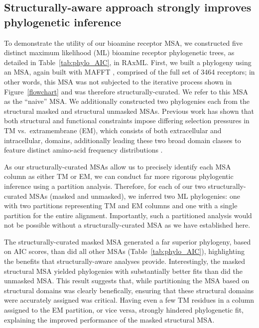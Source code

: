 \documentclass[fleqn,10pt]{wlpeerj}
\begin{document}
\subsection*{Structurally-aware approach strongly improves phylogenetic inference}

To demonstrate the utility of our bioamine receptor MSA, we constructed five distinct maximum likelihood (ML) bioamine receptor phylogenetic trees, as detailed in Table~\ref{tab:phylo_AIC}, in RAxML. First, we built a phylogeny using an MSA, again built with MAFFT \citep{mafftv7}, comprised of the full set of 3464 receptors; in other words, this MSA was not subjected to the iterative process shown in Figure~\ref{flowchart} and was therefore structurally-curated. We refer to this MSA as the ``naive'' MSA. We additionally constructed two phylogenies each from the structural masked and structural unmasked MSAs. Previous work has shown that both structural and functional constraints impose differing selection pressures in TM vs.\ extramembrane (EM), which consists of both extracellular and intracellular, domains, additionally leading these two broad domain classes to feature distinct amino-acid frequency distributions \cite{Tourasse2000,Stevens2001,Julenius2006,Oberai2009,SpielmanWilke2013,FranzosaXueXia2013}.

As our structurally-curated MSAs allow us to precisely identify each MSA column as either TM or EM, we can conduct far more rigorous phylogentic inference using a partition analysis. Therefore, for each of our two structurally-curated MSAs (masked and unmasked), we inferred two ML phylogenies: one with two partitions representing TM and EM columns and one with a single partition for the entire alignment. Importantly, such a partitioned analysis would not be possible without a structurally-curated MSA as we have established here.

The structurally-curated masked MSA generated a far superior phylogeny, based on AIC scores, than did all other MSAs (Table~\ref{tab:phylo_AIC}), highlighting the benefits that structurally-aware analyses provide. Interestingly, the masked structural MSA yielded phylogenies with substantially better fits than did the unmasked MSA. This result suggests that, while partitioning the MSA based on structural domains was clearly benefically, ensuring that these structural domains were accurately assigned was critical. Having even a few TM residues in a column assigned to the EM partition, or vice versa, strongly hindered phylogenetic fit, explaining the improved performance of the masked structural MSA.
\end{document}
